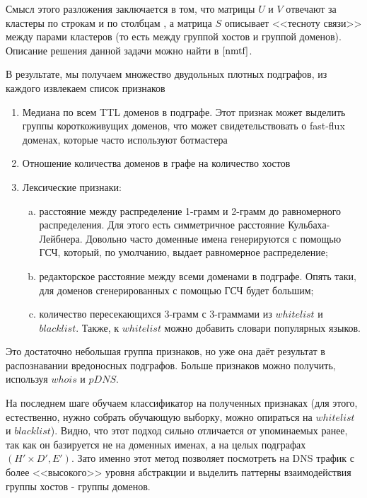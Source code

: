 \documentclass[a4paper,14pt]{extreport} %
\begin{document}
Смысл этого разложения заключается в том, что матрицы $U$ и $V$ отвечают за кластеры по строкам и по столбцам , а матрица $S$ описывает <<тесноту связи>> между парами кластеров (то есть между группой хостов и группой доменов). Описание решения данной задачи можно найти в $\cite{nmtf}$.
	
В результате, мы получаем множество двудольных плотных подграфов, из каждого извлекаем список признаков
	
\begin{enumerate}
	\item Медиана по всем TTL доменов в подграфе. Этот признак может выделить группы короткоживущих доменов, что может свидетельствовать о fast-flux доменах, которые часто используют ботмастера
	\item Отношение количества доменов в графе на количество хостов
	\item Лексические признаки:
	      \begin{enumerate}[a)]
	      		      
	      	\item расстояние между распределение 1-грамм и 2-грамм до равномерного распределения. Для этого есть симметричное расстояние Кульбаха-Лейбнера. Довольно часто доменные имена генерируются с помощью ГСЧ, который, по умолчанию, выдает равномерное распределение;
	      	\item редакторское расстояние между всеми доменами в подграфе. Опять таки, для доменов сгенерированных с помощью ГСЧ будет большим;
	      	\item количество пересекающихся 3-грамм с 3-граммами из $whitelist$ и $blacklist$. Также, к $whitelist$ можно добавить словари популярных языков.
	      \end{enumerate}
\end{enumerate}  

Это достаточно небольшая группа признаков, но уже она даёт результат в распознавании вредоносных подграфов. Больше признаков можно получить, используя $whois$ и $pDNS$.
	
На последнем шаге обучаем классификатор на полученных признаках (для этого, естественно, нужно собрать обучающую выборку, можно опираться на $whitelist$ и $blacklist$). Видно, что этот подход сильно отличается от упоминаемых ранее, так как он базируется не на доменных именах, а на целых подграфах $(H' \times D', E')$. Зато именно этот метод позволяет посмотреть на DNS трафик с более <<высокого>> уровня абстракции и выделить паттерны взаимодействия группы хостов - группы доменов.
	
\end{document}
